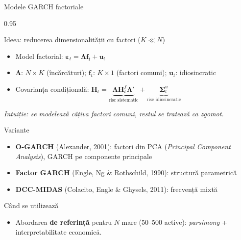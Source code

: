 \documentclass[9pt, aspectratio=169, t]{beamer}
\begin{document}
\begin{frame}{Modele GARCH factoriale}
    \begin{cminipage}{0.95\textwidth}
    \vspace{-3mm}
    {\scriptsize
    \begin{block}{Ideea: reducerea dimensionalității cu factori ($K \ll N$)}
        \begin{itemize}\setlength{\itemsep}{0pt}
            \item Model factorial:
            $\boldsymbol{\varepsilon}_t = \mathbf{\Lambda}\mathbf{f}_t + \mathbf{u}_t$
            \item $\mathbf{\Lambda}$: $N \times K$ (încărcături); $\mathbf{f}_t$: $K \times 1$ (factori comuni); $\mathbf{u}_t$: idiosincratic
            \item Covarianța condițională:
            $\mathbf{H}_t = \underbrace{\mathbf{\Lambda}\mathbf{H}_t^f\mathbf{\Lambda}'}_{\text{risc sistematic}} + \underbrace{\boldsymbol{\Sigma}_t^u}_{\text{risc idiosincratic}}$
        \end{itemize}
        \textit{Intuiție: se modelează câțiva factori comuni, restul se tratează ca zgomot.}
    \end{block}
    \vspace{-2mm}
    \begin{block}{Variante}
        \begin{itemize}\setlength{\itemsep}{0pt}
            \item \textbf{O-GARCH} (Alexander, 2001): factori din PCA (\textit{Principal Component Analysis}), GARCH pe componente principale
            \item \textbf{Factor GARCH} (Engle, Ng \& Rothschild, 1990): structură parametrică
            \item \textbf{DCC-MIDAS} (Colacito, Engle \& Ghysels, 2011): frecvență mixtă
        \end{itemize}
    \end{block}
    \begin{alertblock}{Când se utilizează}
        \begin{itemize}\setlength{\itemsep}{0pt}
            \item Abordarea \textbf{de referință} pentru $N$ mare (50--500 active): \textit{parsimony} + interpretabilitate economică.
        \end{itemize}
    \end{alertblock}
    }
    \end{cminipage}
\end{frame}
\end{document}
